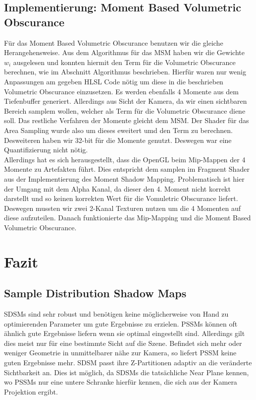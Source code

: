 \documentclass[runningheaders,a4paper]{llncs}
\begin{document}
\subsection{Implementierung: Moment Based Volumetric Obscurance}



Für das Moment Based Volumetric Obscurance benutzen wir die gleiche Herangehensweise.
Aus dem Algorithmus für das MSM haben wir die Gewichte $w_i$ ausgelesen und konnten hiermit den Term für die Volumetric Obscurance berechnen, wie im Abschnitt Algorithmus beschrieben. Hierfür waren nur wenig Anpassungen am gegeben HLSL Code nötig um diese in die beschrieben Volumetric Obscurance einzusetzen. Es werden ebenfalls 4 Momente aus dem Tiefenbuffer generiert. Allerdings aus Sicht der Kamera, da wir einen sichtbaren Bereich samplem wollen, welcher als Term für die Volumetric Obscurance diene soll. Das restliche Verfahren der Momente gleicht dem MSM. Der Shader für das Area Sampling wurde also um dieses eweitert umd den Term zu berechnen.\\
Desweiteren haben wir 32-bit für die Momente genutzt. Deswegen war eine Quantifizierung nicht nötig.\\
Allerdings hat es sich herausgestellt, dass die OpenGL beim Mip-Mappen der 4 Momente zu Artefakten führt. Dies entspricht dem samplen im Fragment Shader aus der Implementierung des Moment Shadow Mapping. Problematisch ist hier der Umgang mit dem Alpha Kanal, da dieser den 4. Moment nicht korrekt darstellt und so keinen  korrekten Wert für die Vomuletric Obscurance liefert. Deswegen mussten wir zwei 2-Kanal Texturen nutzen um die 4 Momenten auf diese aufzuteilen. Danach funktionierte das Mip-Mapping und die Moment Based Volumetric Obscurance.



\section{Fazit}


\subsection{Sample Distribution Shadow Maps}
SDSMs sind sehr robust und benötigen keine möglicherweise von Hand zu optimierenden Parameter um gute Ergebnisse zu erzielen.
PSSMs können oft ähnlich gute Ergebnisse liefern wenn sie optimal eingestellt sind.
Allerdings gilt dies meist nur für eine bestimmte Sicht auf die Szene.
Befindet sich mehr oder weniger Geometrie in unmittelbarer nähe zur Kamera, so liefert PSSM keine guten Ergebnisse mehr.
SDSM passt ihre Z-Partitionen adaptiv an die veränderte Sichtbarkeit an.
Dies ist möglich, da SDSMs die tatsächliche Near Plane kennen, wo PSSMs nur eine untere Schranke hierfür kennen, die sich aus der Kamera Projektion ergibt.
\end{document}
